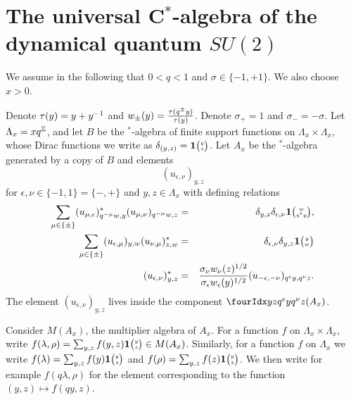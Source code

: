 



\section{The universal C$^*$-algebra of the dynamical quantum $SU(2)$}\label{SecUni}

We assume in the following that $0<q<1$ and $\sigma \in \{-1,+1\}$. We also choose $x>0$.

Denote $\operatorname{\tau}(y) = y+y^{-1}$ and $w_{\pm}(y) = \frac{\operatorname{\tau}(q^{\pm}y)}{\operatorname{\tau}(y)}$. Denote $\sigma_+ = 1$ and $\sigma_- = -\sigma$. Let $\Lambda_x = xq^{\mathbb{Z}}$, and let $B$ be the $^*$-algebra of finite support functions on $\Lambda_x\times \Lambda_x$, whose Dirac functions we write as $\delta_{(y,z)}=\mathbf{1}{\tiny {\begin{pmatrix} y\\z\end{pmatrix}}}$. Let $A_x$ be the $^*$-algebra generated by a copy of $B$ and elements \[(u_{\epsilon,\nu})_{y,z}\] for $\epsilon,\nu\in \{-1,1\}=\{-,+\}$ and $y,z\in \Lambda_x$ with defining relations \begin{eqnarray*} \sum_{\mu\in \{\pm\}} (u_{\mu,\epsilon})_{q^{-\mu}w,y}^* (u_{\mu,\nu})_{q^{-\mu}w,z}&=& \delta_{y,z} \delta_{\epsilon,\nu} \mathbf{1}{\tiny {\begin{pmatrix} w\\q^{\epsilon}y\end{pmatrix}}},\\ \sum_{\mu\in \{\pm\}} (u_{\epsilon,\mu})_{y,w} (u_{\nu,\mu})_{z,w}^* &=& \delta_{\epsilon,\nu}\delta_{y,z} \mathbf{1}{\tiny {\begin{pmatrix} y\\w\end{pmatrix}}} \\ (u_{\epsilon,\nu})_{y,z}^* &=& \frac{\sigma_{\nu}w_{\nu}(z)^{1/2}}{\sigma_{\epsilon}w_{\epsilon}(y)^{1/2}} (u_{-\epsilon,-\nu})_{q^{\epsilon}y,q^{\nu}z}.\end{eqnarray*} The element $(u_{\epsilon,\nu})_{y,z}$ lives inside the component $\Gr{(A_x)}{y}{q^{\epsilon}y}{z}{q^{\nu}z}$.

Consider $M(A_x)$, the multiplier algebra of $A_x$. For a function $f$ on $\Lambda_x\times \Lambda_x$, write $f(\lambda,\rho) = \sum_{y,z} f(y,z)\mathbf{1}{\tiny {\begin{pmatrix} y\\z\end{pmatrix}}} \in M(A_x)$. Similarly, for a function $f$ on $\Lambda_x$ we write $f(\lambda) = \sum_{y,z} f(y)\mathbf{1}{\tiny {\begin{pmatrix} y\\z\end{pmatrix}}}$ and $f(\rho) = \sum_{y,z}f(z)\mathbf{1}{\tiny {\begin{pmatrix} y\\z\end{pmatrix}}}$. We then write for example $f(q\lambda,\rho)$ for the element corresponding to the function $(y,z)\mapsto f(qy,z)$.

